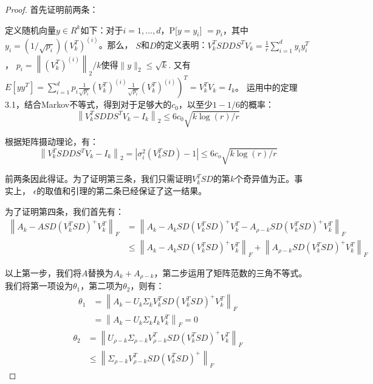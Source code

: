 \documentclass{ctexart}
\begin{document}
    \begin{proof}
        首先证明前两条：

        定义随机向量$y \in R^k$如下：对于$i = 1, \dots, d$，P[$y=y_i$] $= p_i$，其中$y_{i}=(1 / \sqrt{p_{i}})\left(V_{k}^{T}\right)^{(i)}$。那么，
        $S$和$D$的定义表明：$V_{k}^{T} S D D S^{T} V_{k}=\frac{1}{r} \sum_{i=1}^{d} y_{i} y_{i}^{T}$，
        \(p_{i}=\left\|\left(V_{k}^{T}\right)^{(i)}\right\|_{2} / k\)使得\(\|y\|_{2} \leq \sqrt{k}\).
        又有\(\left.E\left[y y^{T}\right]=\sum_{i=1}^{d} p_{i} \frac{1}{\sqrt{p_{i}}}\left(V_{k}^{T}\right)^{(i)} \frac{1}{\sqrt{p_{i}}}\left(V_{k}^{T}\right)^{(i)}\right)^{T}=V_{k}^{T} V_{k}=I_{k}\)。
        运用\cite{rudelson2007sampling}中的定理3.1，结合Markov不等式，得到对于足够大的$c_0$，以至少$1-1/6$的概率：
        $$
        \left\|V_{k}^{T} S D D S^{T} V_{k}-I_{k}\right\|_{2} \leq 6 c_{0} \sqrt{k \log (r) / r}
        $$
        
        根据矩阵摄动理论\cite{boutsidis2009unsupervised}，有：
        $$
        \left\|V_{k}^{T} S D D S^{T} V_{k}-I_{k}\right\|_{2}=\left|\sigma_{i}^{2}\left(V_{k}^{T} S D\right)-1\right| \leq 6 c_{o} \sqrt{k \log (r) / r}
        $$

        前两条因此得证。为了证明第三条，我们只需证明$V_k^T S D$的第$k$个奇异值为正。事实上，
        $\epsilon$的取值和引理的第二条已经保证了这一结果。

        为了证明第四条，我们首先有：
        $$
        \begin{aligned}\left\|A_{k}-A S D\left(V_{k}^{T} S D\right)^{+} V_{k}^{T}\right\|_{F} &=\left\|A_{k}-A_{k} S D\left(V_{k}^{T} S D\right)^{+} V_{k}^{T}-A_{\rho-k} S D\left(V_{k}^{T} S D\right)^{+} V_{k}^{T}\right\|_{F} \\ & \leq\left\|A_{k}-A_{k} S D\left(V_{k}^{T} S D\right)^{+} V_{k}^{T}\right\|_{F}+\left\|A_{\rho-k} S D\left(V_{k}^{T} S D\right)^{+} V_{k}^{T}\right\|_F \end{aligned}
        $$

        以上第一步，我们将$A$替换为$A_k + A_{\rho - k}$，第二步运用了矩阵范数的三角不等式。我们将第一项设为$\theta_1$，第二项为$\theta_2$，则有：
        $$
        \begin{aligned} \theta_{1} &=\left\|A_{k}-U_{k} \Sigma_{k} V_{k}^{T} S D\left(V_{k}^{T} S D\right)^{+} V_{k}^{T}\right\|_{F} \\ &=\left\|A_{k}-U_{k} \Sigma_{k} I_{k} V_{k}^{T}\right\|_{F}=0 \end{aligned}
        $$
        $$
        \begin{aligned} \theta_{2} &=\left\|U_{\rho-k} \Sigma_{\rho-k} V_{\rho-k}^{T} S D\left(V_{k}^{T} S D\right)^{+} V_{k}^{T}\right\|_{F} \\ & \leq\left\|\Sigma_{\rho-k} V_{\rho-k}^{T} S D\left(V_{k}^{T} S D\right)^{+}\right\|_{F} \end{aligned}
        $$


\end{proof}
\end{document}
